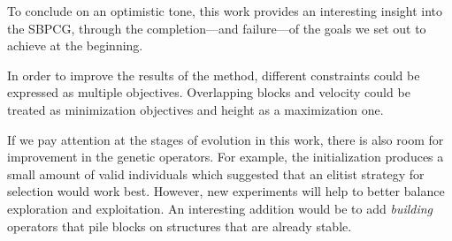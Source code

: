 \documentclass[sigconf]{acmart}
\begin{document}

To conclude on an optimistic tone, this work provides an interesting insight 
into the SBPCG, through the completion---and failure---of the goals we
set out to achieve at the beginning.

In order to improve the results of the method, different constraints could be 
expressed as multiple objectives. Overlapping blocks and velocity could 
be treated as minimization objectives and height as a maximization one. %

If we pay attention at the stages of evolution in this work, there is also 
room for improvement in the genetic operators. For example, the initialization 
produces a small amount of valid individuals which suggested that an elitist 
strategy for selection would work best. However, new experiments will help to 
better balance exploration and exploitation. An interesting addition
would be to add {\em building} operators that pile blocks on
structures that are already stable. %



\end{document}
